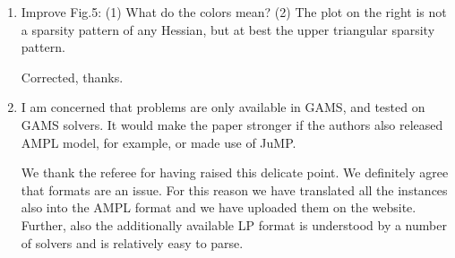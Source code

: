 \documentclass[11pt]{article}
\newcommand{\rep}[1]{{\textcolor{acblue}{#1}}}
\newcommand{\leo}[1]{{\color{red}#1}}
\newcommand{\fabio}[1]{{\color{cyan}#1}}
\begin{document}
{\begin{enumerate}
\rep{
We renamed ``hard" to ``problematic".
However, as explained in \S 2.2.1 and 2.2.2, the analysis of our instances has some limitations. Similar as with nonconvex quadratic constraints that could be reformulated as SOC, also resorting to a reduced Hessian for the objective function is a technique that is applied only by a subset of current QP solvers. It might be interesting, though, to extend our analysis in these directions in the future.
 }


\item Improve Fig.5: (1) What do the colors mean? (2) The plot on the right is not a sparsity pattern
of any Hessian, but at best the upper triangular sparsity pattern.

\rep{Corrected, thanks.}


\item I am concerned that problems are only available in GAMS, and tested on GAMS solvers. It would make the paper stronger if the authors also released AMPL model, for example, or made use of
JuMP.

\rep{
We thank the referee for having raised this delicate point. We definitely agree that formats are an issue.
For this reason we have translated all the instances also into the AMPL format and we have uploaded them on the website.
Further, also the additionally available LP format is understood by a number of solvers and is relatively easy to parse.
}

\end{enumerate}

}
\end{document}
